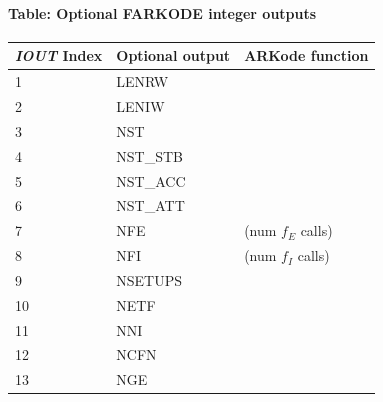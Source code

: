 \documentclass[letterpaper,10pt,english]{sphinxmanual}
\begin{document}
\paragraph{Table: Optional FARKODE integer outputs}
\label{f_interface/Optional_output:table-optional-farkode-integer-outputs}\label{f_interface/Optional_output:finterface-iouttable}
\begin{tabulary}{\linewidth}{|L|L|L|}
\hline
\textbf{\relax 
\emph{IOUT} Index
} & \textbf{\relax 
Optional output
} & \textbf{\relax 
ARKode function
}\\\hline

1
 & 
LENRW
 & 
{\hyperref[c_interface/User_callable:ARKodeGetWorkSpace]{}}
\\\hline

2
 & 
LENIW
 & 
{\hyperref[c_interface/User_callable:ARKodeGetWorkSpace]{}}
\\\hline

3
 & 
NST
 & 
{\hyperref[c_interface/User_callable:ARKodeGetNumSteps]{}}
\\\hline

4
 & 
NST\_STB
 & 
{\hyperref[c_interface/User_callable:ARKodeGetNumExpSteps]{}}
\\\hline

5
 & 
NST\_ACC
 & 
{\hyperref[c_interface/User_callable:ARKodeGetNumAccSteps]{}}
\\\hline

6
 & 
NST\_ATT
 & 
{\hyperref[c_interface/User_callable:ARKodeGetNumStepAttempts]{}}
\\\hline

7
 & 
NFE
 & 
{\hyperref[c_interface/User_callable:ARKodeGetNumRhsEvals]{}} (num $f_E$ calls)
\\\hline

8
 & 
NFI
 & 
{\hyperref[c_interface/User_callable:ARKodeGetNumRhsEvals]{}} (num $f_I$ calls)
\\\hline

9
 & 
NSETUPS
 & 
{\hyperref[c_interface/User_callable:ARKodeGetNumLinSolvSetups]{}}
\\\hline

10
 & 
NETF
 & 
{\hyperref[c_interface/User_callable:ARKodeGetNumErrTestFails]{}}
\\\hline

11
 & 
NNI
 & 
{\hyperref[c_interface/User_callable:ARKodeGetNumNonlinSolvIters]{}}
\\\hline

12
 & 
NCFN
 & 
{\hyperref[c_interface/User_callable:ARKodeGetNumNonlinSolvConvFails]{}}
\\\hline

13
 & 
NGE
 & 
{\hyperref[c_interface/User_callable:ARKodeGetNumGEvals]{}}
\\\hline
\end{tabulary}
\end{document}
